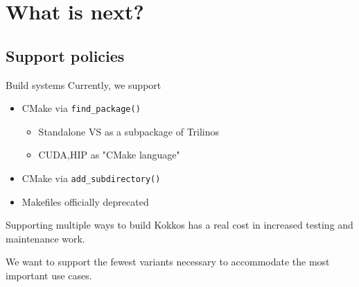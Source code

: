 \section{What is next?}
\subsection{Support policies}

\begin{frame}[fragile]{Build systems}
Currently, we support
\begin{itemize}
\item CMake via \texttt{find\_package()}
  \begin{itemize}
  \item Standalone VS as a subpackage of Trilinos
  \item CUDA,HIP as "CMake language"
  \end{itemize}
\item CMake via \texttt{add\_subdirectory()}
\item Makefiles officially deprecated
\end{itemize}


\pause
Supporting multiple ways to build Kokkos has a real cost in increased testing and maintenance work.

\pause
We want to support the fewest variants necessary to accommodate the most important use cases.
\end{frame}

